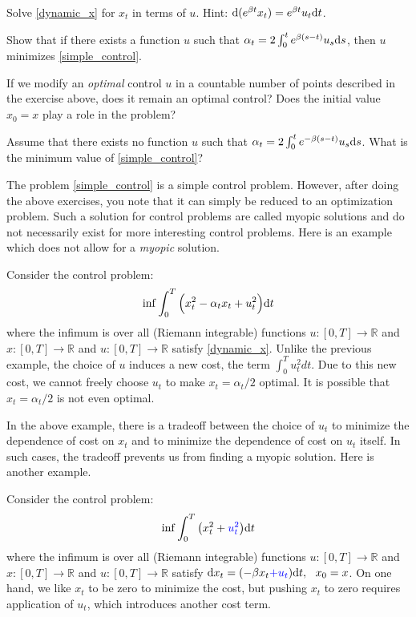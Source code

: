 \documentclass[11pt]{book}
\newcommand{\dd}{\text{\normalfont d}}
\newcommand{\dt}{\text{\normalfont d}t}
\newcommand{\ds}{\text{\normalfont d}s}
\newcommand{\dx}{\text{\normalfont d}x}
\begin{document}
\begin{ex}
Solve \eqref{dynamic_x} for $x_t$ in terms of $u$. Hint: $\dd(e^{\beta t}x_t)=e^{\beta t}u_t{{\dt}}$.
\end{ex}
\begin{ex}
Show that if there exists a function $u$ such that $\alpha_t=2\int_0^te^{\beta (s-t)}u_s {{\ds}}$, then $u$ minimizes \eqref{simple_control}.
\end{ex}
\begin{ex}
    If we modify an \emph{optimal} control $u$ in a countable number of points described in the exercise above, does it remain an optimal control? Does the initial value $x_0=x$ play a role in the problem?
\end{ex}
\begin{ex}
Assume that there exists no function $u$ such that $\alpha_t=2\int_0^te^{-\beta (s-t)}u_s {{\ds}}$. What is the minimum value of \eqref{simple_control}?
\end{ex}

The problem \eqref{simple_control} is a simple control problem. However, after doing the above exercises, you note that it can simply be reduced to an optimization problem. Such a solution for control problems are called myopic solutions and do not necessarily exist for more interesting control problems. Here is an example which does not allow for a \emph{myopic} solution.
\begin{eg}
    Consider the control problem: \begin{equation}\label{cost_u}
        \inf \int_0^T\Big(x_t^2 - \alpha_t x_t + u_t^2 \Big) {{\dt}} 
    \end{equation}
where the infimum is over all (Riemann integrable) functions $u:[0,T]\to\mathbb{R}$ and $x:[0,T]\to\mathbb{R}$ and ${u:[0,T]\to\mathbb{R}}$ satisfy  \eqref{dynamic_x}. Unlike the previous example, the choice of $u$ induces a new cost, the term $\int_0^T u_t^2 dt$. Due to this new cost, we cannot freely choose $u_t$ to make $x_t=\alpha_t/2$ optimal. It is possible that $x_t=\alpha_t/2$ is not even optimal. 
\end{eg}
In the above example, there is a tradeoff between the choice of $u_t$ to minimize the  dependence of cost on $x_t$ and to minimize  the dependence of cost on $u_t$ itself. In such cases, the tradeoff prevents us from finding a myopic solution. Here is another example.
\begin{eg}
    Consider the control problem: \begin{equation}
        \inf \int_0^T \big(x_t^2+{\color{blue}u_t^2}\big)  {{\dt}} 
    \end{equation}
    where the infimum is over all (Riemann integrable) functions $u:[0,T]\to\mathbb{R}$ and $x:[0,T]\to\mathbb{R}$ and ${u:[0,T]\to\mathbb{R}}$ satisfy  ${\dx}_t = (-\beta x_t  {\color{blue}+ u_t}) {{\dt}}, ~~ x_0=x$. 
    On one hand, we like $x_t$ to be zero to minimize the cost, but pushing $x_t$ to zero requires application of $u_t$, which introduces another cost term.
\end{eg}
\end{document}
